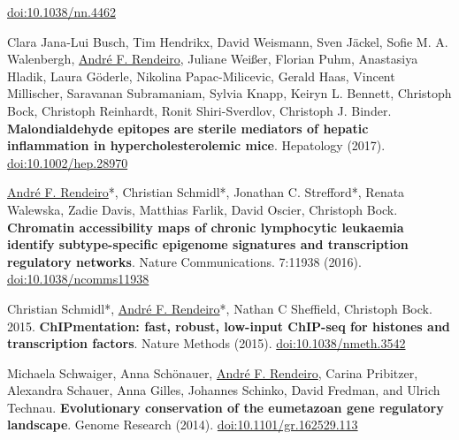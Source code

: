 \documentclass[11pt,a4paper,roman]{moderncv} %
\begin{document}
\begin{etaremune}[leftmargin=1.0cm, itemindent=0pt, topsep=10pt, itemsep=2pt, partopsep=0pt, parsep=0pt]
        \href{https://dx.doi.org/10.1038/nn.4462}{doi:10.1038/nn.4462}
        \item Clara Jana-Lui Busch, Tim Hendrikx, David Weismann, Sven Jäckel, Sofie M. A. Walenbergh, \underline{André F. Rendeiro}, Juliane Weißer, Florian Puhm, Anastasiya Hladik, Laura Göderle, Nikolina Papac-Milicevic, Gerald Haas, Vincent Millischer, Saravanan Subramaniam, Sylvia Knapp, Keiryn L. Bennett, Christoph Bock, Christoph Reinhardt, Ronit Shiri-Sverdlov, Christoph J. Binder. \textbf{Malondialdehyde epitopes are sterile mediators of hepatic inflammation in hypercholesterolemic mice}. Hepatology (2017).
        \href{https://dx.doi.org/10.1002/hep.28970}{doi:10.1002/hep.28970}
        \item \underline{André F. Rendeiro}*, Christian Schmidl*, Jonathan C. Strefford*, Renata Walewska, Zadie Davis, Matthias Farlik, David Oscier, Christoph Bock. \textbf{Chromatin accessibility maps of chronic lymphocytic leukaemia identify subtype-specific epigenome signatures and transcription regulatory networks}. Nature Communications. 7:11938 (2016).
        \href{https://dx.doi.org/10.1038/ncomms11938}{doi:10.1038/ncomms11938}
        \item Christian Schmidl*, \underline{André F. Rendeiro}*,  Nathan C Sheffield, Christoph Bock. 2015. \textbf{ChIPmentation: fast, robust, low-input ChIP-seq for histones and transcription factors}. Nature Methods (2015).
        \href{https://dx.doi.org/10.1038/nmeth.3542}{doi:10.1038/nmeth.3542}
        \item Michaela Schwaiger, Anna Schönauer, \underline{André F. Rendeiro}, Carina Pribitzer, Alexandra Schauer, Anna Gilles, Johannes Schinko, David Fredman, and Ulrich Technau. \textbf{Evolutionary conservation of the eumetazoan gene regulatory landscape}. Genome Research (2014).
        \href{https://dx.doi.org/10.1101/gr.162529.113}{doi:10.1101/gr.162529.113}
        \end{etaremune}
\end{document}
